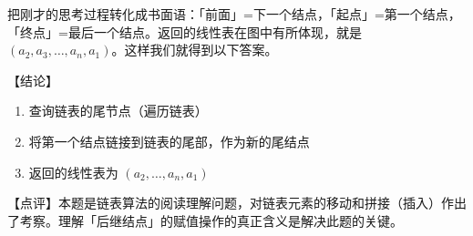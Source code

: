 \documentclass[UTF8]{ctexart}
\begin{document}
把刚才的思考过程转化成书面语：「前面」=下一个结点，「起点」=第一个结点，「终点」=最后一个结点。返回的线性表在图中有所体现，就是 $(a_2,a_3,\dots,a_n,a_1)$。这样我们就得到以下答案。

\vspace{1em}
{\color{cyan!80!black} 【结论】
\begin{enumerate}
    \item 查询链表的尾节点（遍历链表）
    \item 将第一个结点链接到链表的尾部，作为新的尾结点
    \item 返回的线性表为 $(a_2,\dots,a_n,a_1)$
\end{enumerate}

【点评】本题是链表算法的阅读理解问题，对链表元素的移动和拼接（插入）作出了考察。理解「后继结点」的赋值操作的真正含义是解决此题的关键。
}
\end{document}
